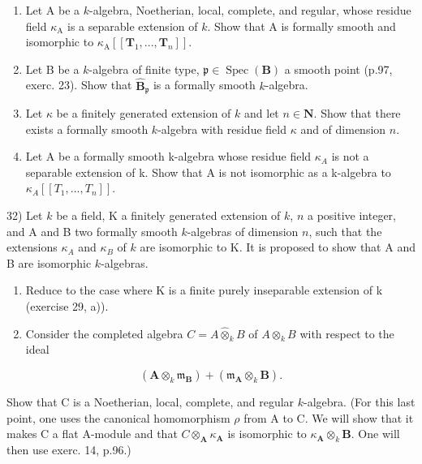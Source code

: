 \begin{enumerate}
\def\labelenumi{\alph{enumi})}
\item
  Let A be a \(k\)-algebra, Noetherian, local, complete, and regular, whose residue field \(\kappa_{\mathrm{A}}\) is a separable extension of \(k\). Show that A is formally smooth and isomorphic to \(\kappa_{\mathrm{A}}[[\mathbf{T}_{1}, ..., \mathbf{T}_{n}]]\).
\item
  Let B be a \(k\)-algebra of finite type, \(\mathfrak{p} \in \operatorname{Spec}(\mathbf{B})\) a smooth point (p.97, exerc. 23). Show that \(\hat{\mathbf{B}}_{\mathfrak{p}}\) is a formally smooth \(k\)-algebra.
\item
  Let \(\kappa\) be a finitely generated extension of \(k\) and let \(n\in\mathbf{N}\). Show that there exists a formally smooth \(k\)-algebra with residue field \(\kappa\) and of dimension \(n\).
\item
  Let A be a formally smooth k-algebra whose residue field \(\kappa_{A}\) is not a separable extension of k. Show that A is not isomorphic as a k-algebra to \(\kappa_{A}[[T_{1},...,T_{n}]]\).
\end{enumerate}

32) Let \(k\) be a field, K a finitely generated extension of \(k\), \(n\) a positive integer, and A and B two formally smooth \(k\)-algebras of dimension \(n\), such that the extensions \(\kappa_{A}\) and \(\kappa_{B}\) of \(k\) are isomorphic to K. It is proposed to show that A and B are isomorphic \(k\)-algebras.

\begin{enumerate}
\def\labelenumi{\alph{enumi})}
\item
  Reduce to the case where K is a finite purely inseparable extension of k (exercise 29, a)).
\item
  Consider the completed algebra \(C = A \hat{\otimes}_{k} B\) of \(A \otimes_{k} B\) with respect to the ideal
\end{enumerate}

\[
\left(\mathbf {A} \otimes_ {k} \mathfrak {m} _ {\mathbf {B}}\right) + \left(\mathfrak {m} _ {\mathbf {A}} \otimes_ {k} \mathbf {B}\right).
\]

Show that C is a Noetherian, local, complete, and regular \(k\)-algebra. (For this last point, one uses the canonical homomorphism \(\rho\) from A to C. We will show that it makes C a flat A-module and that \(C \otimes_{\mathbf{A}} \kappa_{\mathbf{A}}\) is isomorphic to \(\kappa_{\mathbf{A}} \otimes_{k} \mathbf{B}\). One will then use exerc. 14, p.96.)

